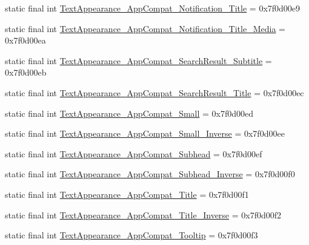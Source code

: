 \begin{DoxyCompactItemize}
\item 
static final int \mbox{\hyperlink{classandroid_1_1support_1_1v7_1_1appcompat_1_1R_1_1style_a552ed39a2724d11b54f61ed329312ca1}{Text\+Appearance\+\_\+\+App\+Compat\+\_\+\+Notification\+\_\+\+Title}} = 0x7f0d00e9
\item 
static final int \mbox{\hyperlink{classandroid_1_1support_1_1v7_1_1appcompat_1_1R_1_1style_aafd8c22828180e8ba7543ed3a6b8ee8c}{Text\+Appearance\+\_\+\+App\+Compat\+\_\+\+Notification\+\_\+\+Title\+\_\+\+Media}} = 0x7f0d00ea
\item 
static final int \mbox{\hyperlink{classandroid_1_1support_1_1v7_1_1appcompat_1_1R_1_1style_abc8d67744de25dad47ee20f7558b9e61}{Text\+Appearance\+\_\+\+App\+Compat\+\_\+\+Search\+Result\+\_\+\+Subtitle}} = 0x7f0d00eb
\item 
static final int \mbox{\hyperlink{classandroid_1_1support_1_1v7_1_1appcompat_1_1R_1_1style_a2bb5c5d5e65b3e1c48527de626155a79}{Text\+Appearance\+\_\+\+App\+Compat\+\_\+\+Search\+Result\+\_\+\+Title}} = 0x7f0d00ec
\item 
static final int \mbox{\hyperlink{classandroid_1_1support_1_1v7_1_1appcompat_1_1R_1_1style_a2f18b3bec0af714ec2cbe27b8dc88310}{Text\+Appearance\+\_\+\+App\+Compat\+\_\+\+Small}} = 0x7f0d00ed
\item 
static final int \mbox{\hyperlink{classandroid_1_1support_1_1v7_1_1appcompat_1_1R_1_1style_a3c7b4f535d06f2b882bc1bf42cbccea7}{Text\+Appearance\+\_\+\+App\+Compat\+\_\+\+Small\+\_\+\+Inverse}} = 0x7f0d00ee
\item 
static final int \mbox{\hyperlink{classandroid_1_1support_1_1v7_1_1appcompat_1_1R_1_1style_a898c904d8860090b71256fea299d0331}{Text\+Appearance\+\_\+\+App\+Compat\+\_\+\+Subhead}} = 0x7f0d00ef
\item 
static final int \mbox{\hyperlink{classandroid_1_1support_1_1v7_1_1appcompat_1_1R_1_1style_ad5e427783ecc5b5eb78038cc5e29ecc8}{Text\+Appearance\+\_\+\+App\+Compat\+\_\+\+Subhead\+\_\+\+Inverse}} = 0x7f0d00f0
\item 
static final int \mbox{\hyperlink{classandroid_1_1support_1_1v7_1_1appcompat_1_1R_1_1style_a673070a66526923c44e85b82bfeed62d}{Text\+Appearance\+\_\+\+App\+Compat\+\_\+\+Title}} = 0x7f0d00f1
\item 
static final int \mbox{\hyperlink{classandroid_1_1support_1_1v7_1_1appcompat_1_1R_1_1style_a53b6dccae2ab8fbf4a64fa6e8b3e4952}{Text\+Appearance\+\_\+\+App\+Compat\+\_\+\+Title\+\_\+\+Inverse}} = 0x7f0d00f2
\item 
static final int \mbox{\hyperlink{classandroid_1_1support_1_1v7_1_1appcompat_1_1R_1_1style_ac5978ff086288051c1546ca21a6b5aac}{Text\+Appearance\+\_\+\+App\+Compat\+\_\+\+Tooltip}} = 0x7f0d00f3

\end{DoxyCompactItemize}
